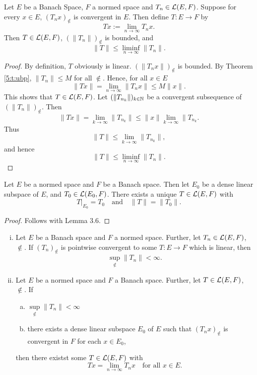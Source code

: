 \begin{kor}\label{5:c:10}
Let $E$ be a Banach Space, $F$ a normed space and $T_n\in\mathcal L(E,F)$.
Suppose for every $x\in E$, $(T_nx)_\nin$ is convergent in $E$.
Then define $T\colon E\to F$ by \[Tx:=\lim_{n\to\infty}T_nx.\]
Then $T\in\mathcal L(E,F)$, $(\|T_n\|)_\nin$ is bounded, and \[\|T\|\leq\liminf_{n\to\infty}\|T_n\|.\]
\end{kor}
\begin{proof} By definition, $T$ obviously is linear. $(\|T_nx\|)_\nin$ is bounded. By Theorem \ref{5:t:ubp}, $\|T_n\|\leq M$ for all $\nin$.
Hence, for all $x\in E$ \[\|Tx\|=\lim_{n\to\infty}\|T_nx\|\leq M\|x\|.\]
This shows that $T\in\mathcal L(E,F)$.
Let $(\|T_{n_k}\|)_{k\in\mathbb{N}}$ be a convergent subsequence of $(\|T_n\|)_\nin$.
Then \[\|Tx\|=\lim_{k\to\infty}\|T_{n_k}\|\leq\|x\|\lim_{k\to\infty}\|T_{n_k}.\]
Thus \[\|T\|\leq\lim_{k\to\infty}\|T_{n_k}\|,\] and hence \[\|T\|\leq\liminf_{n\to\infty}\|T_n\|.\]
\end{proof}
\begin{lemma}\label{5:l:11}
Let $E$ be a normed space and $F$ be a Banach space.
Then let $E_0$ be a dense linear subspace of $E$, and $T_0\in\mathcal L(E_0,F)$.
There exists a unique $T\in\mathcal L(E,F)$ with \[T\vert_{E_0}=T_0\quad\text{and}\quad\|T\|=\|T_0\|.\]
\end{lemma}
\begin{proof}Follows with Lemma 3.6.
\end{proof}
\begin{theo}\label{5:t:bst}\hfill

\begin{enumerate}[(i)]\item Let $E$ be a Banach space and $F$ a normed space. Further, let $T_n\in\mathcal L(E,F)$, $\nin$.
If $(T_n)_\nin$ is pointwise convergent to some $T\colon E\to F$ which is linear, then \[\sup_\nin\|T_n\|<\infty.\]

\item Let $E$ be a normed space and $F$ a Banach space. Further, let $T\in\mathcal L(E,F)$, $\nin$. If
\begin{enumerate}[(a)]\item $\sup\limits_\nin\|T_n\|<\infty$
\item there exists a dense linear subspace $E_0$ of $E$ such that $(T_nx)_\nin$ is convergent in $F$ for each $x\in E_0$,
\end{enumerate}
then there existst some $T\in\mathcal L(E,F)$ with \[Tx=\lim_{n\to\infty}T_nx\quad\text{for all }x\in E.\]
\end{enumerate}
\end{theo}
